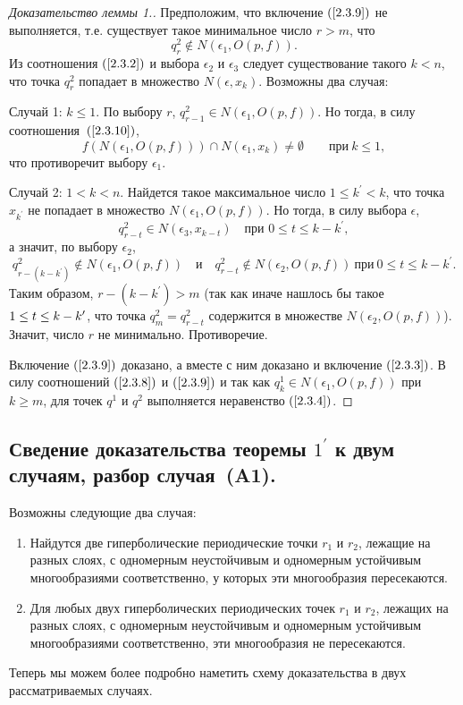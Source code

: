\documentclass[12pt]{article}
\begin{document}
\begin{proof}[Доказательство леммы 1.]
Предположим, что включение $(\ref{2.3.9})$ не выполняется, т.е. существует такое минимальное число $r>m$, что
\begin{equation}
\label{2.3.10}
q^2_r\notin N(\epsilon_1,O(p,f)).
\end{equation}
Из соотношения $(\ref{2.3.2})$ и выбора $\epsilon_2$ и $\epsilon_3$ следует существование такого $k<n$, что
точка $q^2_r$ попадает в множество $N(\epsilon,x_k)$.
Возможны два случая:

Случай 1: $k\leq 1$. По выбору $r$, $q^2_{r-1}\in N(\epsilon_1,O(p,f))$. Но тогда, в силу соотношения~$(\ref{2.3.10})$,
$$f(N(\epsilon_1,O(p,f)))\cap N(\epsilon_1,x_k)\neq\emptyset\qquad\textrm{при}\ k\leq1,$$ 
что противоречит выбору $\epsilon_1$.

Случай 2: $1<k< n$. Найдется такое максимальное число $1\leq k^\prime<k$, что
точка $x_{k^{\prime}}$ не попадает в множество $N(\epsilon_1,O(p,f))$. 
Но тогда, в силу выбора $\epsilon$,
$$q^2_{r-t}\in N(\epsilon_3,x_{k-t})\quad\textrm{при }0\leq t\leq k-k^{\prime},$$
а значит, по выбору $\epsilon_2$,
$$q^2_{r-(k-k^\prime)}\notin N(\epsilon_1, O(p,f))\quad\textrm{и}\quad q^2_{r-t}\notin N(\epsilon_2,O(p,f))\ \textrm{при}\ 0\leq t\leq k-k^\prime.$$
Таким образом, $r-(k-k^\prime)>m$ (так как иначе нашлось бы такое $1\nobreak\leq\nobreak t\nobreak\leq\nobreak k\nobreak -\nobreak k^{\prime}$, что точка $q^2_m=q^2_{r-t}$ содержится в множестве $N(\epsilon_2,O(p,f))$). Значит, число $r$ не минимально. Противоречие.
 
Включение $(\ref{2.3.9})$ доказано, а вместе с ним доказано и включение $(\ref{2.3.3})$. В силу соотношений $(\ref{2.3.8})$ и $(\ref{2.3.9})$ и так как $q^1_k\in N(\epsilon_1,O(p,f))$ при $k\geq m$, %
для точек $q^1$ и $q^2$ выполняется неравенство $(\ref{2.3.4})$. %
\end{proof}
\subsection{Сведение доказательства теоремы $\mbox{1}^{\prime}$ к двум случаям, разбор случая~(A1).}

Возможны следующие два случая:
\begin{enumerate}
\item[(A1)] 
Найдутся две гиперболические периодические точки $r_1$ и $r_2$, лежащие на разных слоях, с одномерным неустойчивым и одномерным устойчивым многообразиями соответственно, у которых эти многообразия пересекаются.  
\item[(A2)] 
Для любых двух гиперболических периодических точек $r_1$ и $r_2$, лежащих на разных слоях, с одномерным неустойчивым и одномерным устойчивым многообразиями соответственно, эти многообразия не пересекаются.  
\end{enumerate}
Теперь мы можем более подробно наметить
схему доказательства в двух рассматриваемых случаях.
\end{document}
